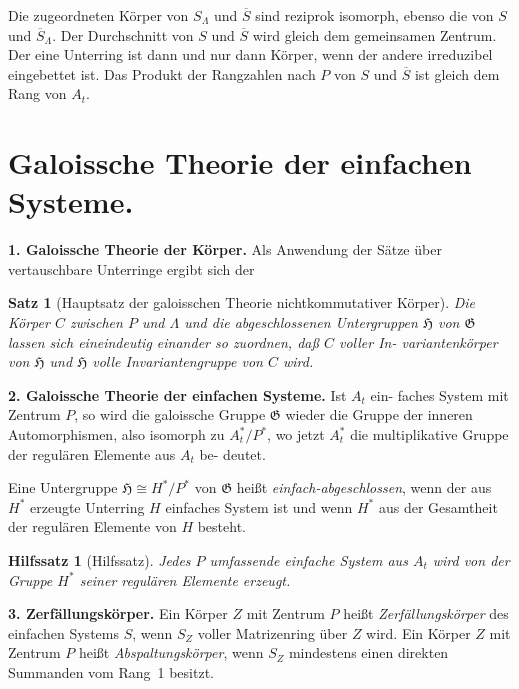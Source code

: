 \documentclass[12pt,a4paper]{article}
\theoremstyle{plain}
\newtheorem*{satz}{Satz}
\newtheorem*{lemma}{Hilfssatz}
\newcommand{\Ga}{\mathfrak{G}}
\begin{document}
Die zugeordneten K\"orper von $S_\Lambda$ und $\overline{S}$ sind reziprok isomorph, ebenso
die von $S$ und $\overline{S}_\Lambda$. Der Durchschnitt von $S$ und $\overline{S}$ wird gleich dem gemeinsamen
Zentrum. Der eine Unterring ist dann und nur dann K\"orper, wenn der
andere irreduzibel eingebettet ist. Das Produkt der Rangzahlen nach $P$
von $S$ und $\overline{S}$ ist gleich dem Rang von $A_t$.

\section{Galoissche Theorie der einfachen Systeme.}
\label{sec:galoistheorie}

\medskip
\noindent\textbf{1. Galoissche Theorie der K\"orper.}\hspace{0.5em}%
Als Anwendung der S\"atze \"uber vertauschbare Unterringe ergibt sich der

\begin{satz}[Hauptsatz der galoisschen Theorie nichtkommutativer
K\"orper]
Die K\"orper $C$ zwischen $P$ und $\Lambda$ und die abgeschlossenen Untergruppen
$\mathfrak{H}$ von $\Ga$ lassen sich eineindeutig einander so zuordnen, da\ss{} $C$ voller In-
variantenk\"orper von $\mathfrak{H}$ und $\mathfrak{H}$ volle Invariantengruppe von $C$ wird.
\end{satz}

\medskip
\noindent\textbf{2. Galoissche Theorie der einfachen Systeme.}\hspace{0.5em}%
Ist $A_t$ ein-
faches System mit Zentrum $P$, so wird die galoissche Gruppe $\Ga$ wieder
die Gruppe der inneren Automorphismen, also isomorph zu $A_t^*/P^*$, wo
jetzt $A_t^*$ die multiplikative Gruppe der regul\"aren Elemente aus $A_t$ be-
deutet.

Eine Untergruppe $\mathfrak{H} \cong H^*/P^*$ von $\Ga$ hei\ss t \emph{einfach-abgeschlossen},
wenn der aus $H^*$ erzeugte Unterring $H$ einfaches System ist und wenn $H^*$
aus der Gesamtheit der regul\"aren Elemente von $H$ besteht.

\begin{lemma}[Hilfssatz]
Jedes $P$ umfassende einfache System aus $A_t$ wird von der
Gruppe $H^*$ seiner regul\"aren Elemente erzeugt.
\end{lemma}

\medskip
\noindent\textbf{3. Zerf\"allungsk\"orper.}\hspace{0.5em}%
Ein K\"orper $Z$ mit Zentrum $P$ hei\ss t
\emph{Zerf\"allungsk\"orper} des einfachen Systems $S$, wenn $S_Z$ voller Matrizenring
\"uber $Z$ wird. Ein K\"orper $Z$ mit Zentrum $P$ hei\ss t \emph{Abspaltungsk\"orper},
wenn $S_Z$ mindestens einen direkten Summanden vom Rang~1 besitzt.
\end{document}
